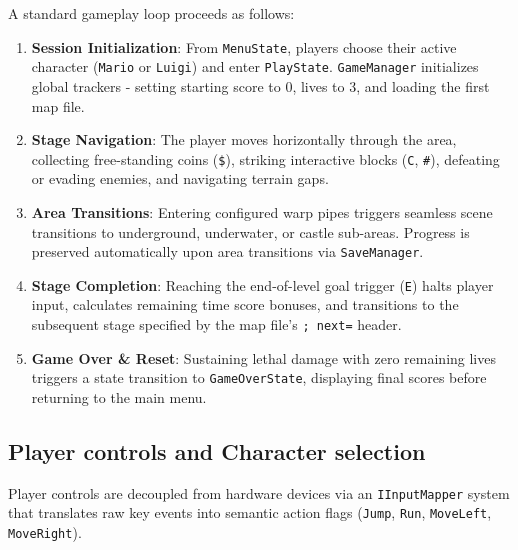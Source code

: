 \documentclass[12pt, a4paper]{article}
\begin{document}
A standard gameplay loop proceeds as follows:
\begin{enumerate}
\item \textbf{Session Initialization}: From \texttt{MenuState}, players choose their active character (\texttt{Mario} or \texttt{Luigi}) and enter \texttt{PlayState}. \texttt{GameManager} initializes global trackers - setting starting score to 0, lives to 3, and loading the first map file.
\item \textbf{Stage Navigation}: The player moves horizontally through the area, collecting free-standing coins (\texttt{\$}), striking interactive blocks (\texttt{C}, \texttt{\#}), defeating or evading enemies, and navigating terrain gaps.
\item \textbf{Area Transitions}: Entering configured warp pipes triggers seamless scene transitions to underground, underwater, or castle sub-areas. Progress is preserved automatically upon area transitions via \texttt{SaveManager}.
\item \textbf{Stage Completion}: Reaching the end-of-level goal trigger (\texttt{E}) halts player input, calculates remaining time score bonuses, and transitions to the subsequent stage specified by the map file's \texttt{; next=} header.
\item \textbf{Game Over \& Reset}: Sustaining lethal damage with zero remaining lives triggers a state transition to \texttt{GameOverState}, displaying final scores before returning to the main menu.
\end{enumerate}

\subsection{Player controls and Character selection}

Player controls are decoupled from hardware devices via an \texttt{IInputMapper} system that translates raw key events into semantic action flags (\texttt{Jump}, \texttt{Run}, \texttt{MoveLeft}, \texttt{MoveRight}).
\end{document}
